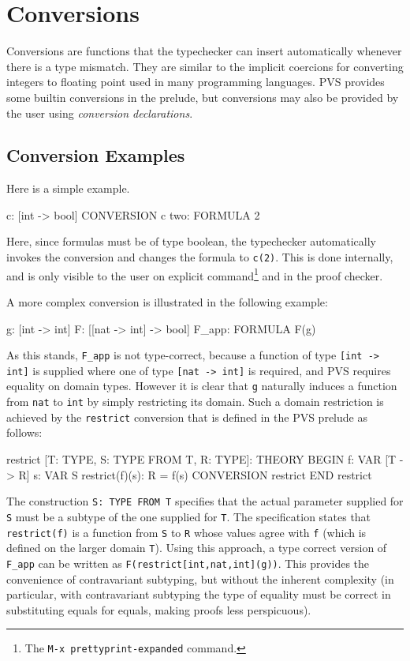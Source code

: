 \section{Conversions}
\label{coercion-decls}

Conversions are functions that the typechecker can insert automatically
whenever there is a type mismatch.  They are similar to the implicit
coercions for converting integers to floating point used in many
programming languages.  PVS provides some builtin conversions in the
prelude, but conversions may also be provided by the user using
\emph{conversion declarations}.

\subsection{Conversion Examples}
\label{conversion-examples}

Here is a simple example.
\begin{pvsex}
  c: [int -> bool]
  CONVERSION c
  two: FORMULA 2
\end{pvsex}
Here, since formulas must be of type boolean, the typechecker
automatically invokes the conversion and changes the formula to
\texttt{c(2)}.  This is done internally, and is only visible to the user
on explicit command\footnote{The \texttt{M-x~prettyprint-expanded} command.}
and in the proof checker.

A more complex conversion is illustrated in the following example:
\begin{pvsex}
  g: [int -> int]
  F: [[nat -> int] -> bool]
  F_app: FORMULA F(g)
\end{pvsex}
As this stands, \texttt{F\_app} is not type-correct, because a function of
type \texttt{[int -> int]} is supplied where one of type \texttt{[nat ->
int]} is required, and PVS requires equality on domain types.  However it
is clear that \texttt{g} naturally induces a function from \texttt{nat} to
\texttt{int} by simply restricting its domain.  Such a domain restriction
is achieved by the \texttt{restrict} conversion that is defined in the PVS
prelude as follows:
\begin{pvsex}
  restrict [T: TYPE, S: TYPE FROM T, R: TYPE]: THEORY
   BEGIN
    f: VAR [T -> R]
    s: VAR S
    restrict(f)(s): R = f(s)
    CONVERSION restrict
   END restrict
\end{pvsex}
The construction \texttt{S: TYPE FROM T} specifies that the actual
parameter supplied for \texttt{S} must be a subtype of the one supplied
for \texttt{T}.  The specification states that \texttt{restrict(f)} is a
function from \texttt{S} to \texttt{R} whose values agree with \texttt{f}
(which is defined on the larger domain \texttt{T}).  Using this approach,
a type correct version of \texttt{F\_app} can be written as
\texttt{F(restrict[int,nat,int](g))}.  This provides the convenience of
contravariant subtyping, but without the inherent complexity (in
particular, with contravariant subtyping the type of equality must be
correct in substituting equals for equals, making proofs less
perspicuous).

